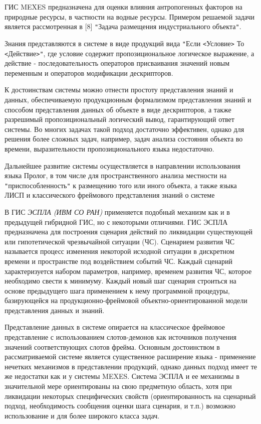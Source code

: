 \documentclass{article}
\begin{document}
ГИС MEXES предназначена для оценки влияния антропогенных 
факторов на природные ресурсы, в частности 
на водные ресурсы. Примером решаемой задачи 
является рассмотренная в [8] \texttt{"}Задача размещения 
индустриального объекта\texttt{"}.  

Знания представляются в системе в виде продукций 
вида \texttt{"}Если \texttt{<}Условие\texttt{>} То \texttt{<}Действие\texttt{>}\texttt{"}, 
где условие содержит пропозициональное логическое 
выражение, а действие - последовательность 
операторов присваивания значений новым переменным 
и операторов модификации дескрипторов.

К достоинствам системы можно отнести простоту 
представления знаний и данных, обеспечиваемую 
продукционным формализмом представления знаний 
и способом представления данных об объекте 
в виде дескрипторов, а также разрешимый пропозициональный 
логический вывод, гарантирующий ответ системы. 
Во многих задачах такой подход достаточно эффективен, 
однако для решения более сложных  задач, например, 
задач анализа состояния объекта во времени, 
выразительности пропозиционального языка 
недостаточно. 

Дальнейшее развитие системы осуществляется 
в направлении использования языка Пролог, в 
том числе для пространственного анализа местности 
на \texttt{"}приспособленность\texttt{"} к размещению 
того или иного объекта, а также языка ЛИСП и 
классического фреймового представления знаний 
о системе

В ГИС \label{HToc28945737}\textit{ЭСПЛА (ИВМ СО РАН) } применяется 
подобный механизм как и в предыдущей гибридной 
ГИС, но с некоторыми отличиями. ГИС ЭСПЛА предназначена 
для построения сценария действий по ликвидации 
существующей или гипотетической чрезвычайной 
ситуации (ЧС). Сценарием развития ЧС называется 
процесс изменения некоторой исходной ситуации 
в дискретном времени и пространстве под воздействием 
событий ЧС. Каждый сценарий характеризуется 
набором параметров, например, временем развития 
ЧС, которое необходимо свести к минимуму. Каждый 
новый шаг сценария строиться на основе предыдущего 
шага применением к нему программной процедуры, 
базирующейся на продукционно-фреймовой объектно-ориентированной 
модели представления данных и знаний.

Представление данных в системе опирается на 
классическое фреймовое представление с использованием 
слотов-демонов как источников получения значений 
соответствующих слотов фрейма. Основным достоинством 
в рассматриваемой системе является существенное 
расширение языка - применение нечетких механизмов 
в представлении продукций, однако данных подход 
имеет те же недостатки как и у системы MEXES. Система 
ЭСПЛА и ее механизмы в значительной мере ориентированы 
на свою предметную область, хотя при ликвидации 
некоторых специфических свойств (ориентированность 
на сценарный подход, необходимость сообщения 
оценки шага сценария, и т.п.) возможно использование 
и для более широкого класса задач. 
\end{document}

